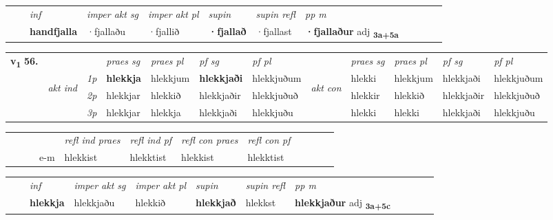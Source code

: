 \begin{tabular}{llllllllllll}
 & & \textit{inf} & \textit{imper akt sg} & \textit{imper akt pl}    & \textit{supin} & \textit{supin refl} & \textit{pp m}     \\*
  & & \textbf{handfjalla} & ·fjallaðu  & ·fjallið    &  \textbf{·fjallað} & ·fjallast & \textbf{·fjallaður} adj \textbf{\textsubscript{3a+5a}} \\*
\cmidrule{1-12}
\end{tabular}



\begin{tabular}{llllllllllll} \toprule
\multirow{4}{*}{{{\textbf{v{\textsubscript{1}}} \Large{\textbf{56.}}}}}  & &   &  \textit{praes sg}  & \textit{praes pl}  &\textit{ pf sg} & \textit{pf pl} &  &  \textit{praes sg}  & \textit{praes pl}  & \textit{pf sg} & \textit{pf pl } \\*
	\cmidrule{4-7} \cmidrule{9-12}
 & \multirow{3}{*}{\begin{turn}{90}\textit{akt ind}\end{turn}} & {\textit{1p}} & \textbf{hlekkja} & hlekkjum    & \textbf{hlekkjaði} & hlekkjuðum & \multirow{3}{*}{\begin{turn}{90}\textit{akt con}\end{turn}} &hlekki & hlekkjum & hlekkjaði & hlekkjuðum\\*
& &  {\textit{2p}} &  hlekkjar  & hlekkið   & hlekkjaðir & hlekkjuðuð & & hlekkir & hlekkið & hlekkjaðir & hlekkjuðuð \\*
& &  {\textit{3p}} & hlekkjar & hlekkja   & hlekkjaði & hlekkjuðu & & hlekki & hlekki& hlekkjaði & hlekkjuðu  \\*
\cmidrule{4-7} \cmidrule{9-12}
\end{tabular}


\begin{tabular}{llllllllllll}
 & &  & &  \textit{refl ind praes} & \textit{refl ind pf} & \textit{refl con praes} & \textit{refl con pf} \\*
&  & & e-m & hlekkist & hlekktist & hlekkist & hlekktist \\*
\cmidrule{5-9}
\end{tabular}


\begin{tabular}{llllllllllll}
 & & \textit{inf} & \textit{imper akt sg} & \textit{imper akt pl}    & \textit{supin} & \textit{supin refl} & \textit{pp m}     \\*
  & & \textbf{hlekkja} & hlekkjaðu  & hlekkið    &  \textbf{hlekkjað} & hlekkst & \textbf{hlekkjaður} adj \textbf{\textsubscript{3a+5c}} \\*
\cmidrule{1-12}
\end{tabular}



